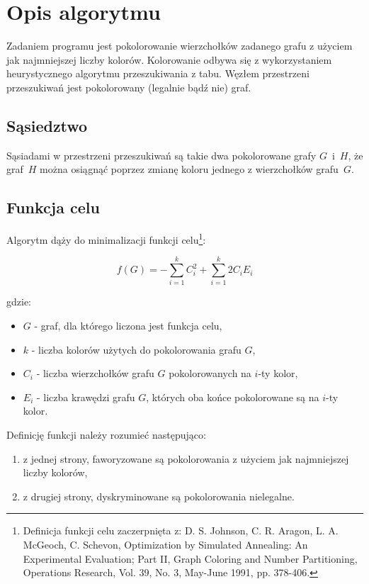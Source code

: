 \section{Opis algorytmu}
Zadaniem programu jest pokolorowanie wierzchołków zadanego grafu z użyciem jak najmniejszej liczby kolorów.
Kolorowanie odbywa się z wykorzystaniem heurystycznego algorytmu przeszukiwania z tabu.
Węzłem przestrzeni przeszukiwań jest pokolorowany (legalnie bądź nie) graf.

\subsection{Sąsiedztwo}
Sąsiadami w przestrzeni przeszukiwań są takie dwa pokolorowane grafy $G$~i~$H$, że graf~$H$ można osiągnąć poprzez zmianę koloru jednego z wierzchołków grafu~$G$.

\subsection{Funkcja celu}
Algorytm dąży do minimalizacji funkcji celu\footnote{Definicja funkcji celu zaczerpnięta z: D. S. Johnson, C. R. Aragon, L. A. McGeoch, C. Schevon, Optimization by Simulated Annealing: An Experimental Evaluation; Part II, Graph Coloring and Number Partitioning, Operations Research, Vol. 39, No. 3, May-June 1991, pp. 378-406.}:

\begin{equation}
 f(G) = -\sum_{i=1}^{k} C_i^2 + \sum_{i=1}^{k} 2 C_i E_i
\end{equation}

gdzie:
\begin{itemize}
 \item $G$ - graf, dla którego liczona jest funkcja celu,
 \item $k$ - liczba kolorów użytych do pokolorowania grafu $G$,
 \item $C_i$ - liczba wierzchołków grafu $G$ pokolorowanych na $i$-ty kolor,
 \item $E_i$ - liczba krawędzi grafu $G$, których oba końce pokolorowane są na $i$-ty kolor.
\end{itemize}

Definicję funkcji należy rozumieć następująco:

\begin{enumerate}
 \item z jednej strony, faworyzowane są pokolorowania z użyciem jak najmniejszej liczby kolorów,
 \item z drugiej strony, dyskryminowane są pokolorowania nielegalne.
\end{enumerate}

